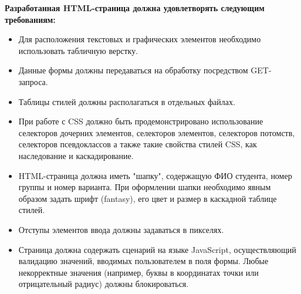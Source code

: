 \documentclass[12pt]{article}
\begin{document}
\textbf{Разработанная HTML-страница должна удовлетворять следующим требованиям:}\\
\begin{itemize}
    \item Для расположения текстовых и графических элементов необходимо использовать
    табличную верстку.\\
    \item Данные формы должны передаваться на обработку посредством GET-запроса.\\
    \item Таблицы стилей должны располагаться в отдельных файлах.\\
    \item При работе с CSS должно быть продемонстрировано использование селекторов дочерних
    элементов, селекторов элементов, селекторов потомств, селекторов псевдоклассов а также
    такие свойства стилей CSS, как наследование и каскадирование.\\
    \item HTML-страница должна иметь "шапку", содержащую ФИО студента, номер группы и
    номер варианта. При оформлении шапки необходимо явным образом задать шрифт
    (fantasy), его цвет и размер в каскадной таблице стилей.\\
    \item Отступы элементов ввода должны задаваться в пикселях.\\
    \item Страница должна содержать сценарий на языке JavaScript, осуществляющий валидацию
    значений, вводимых пользователем в поля формы. Любые некорректные значения
    (например, буквы в координатах точки или отрицательный радиус) должны блокироваться.\\
\end{itemize}

\vspace{1cm}

\end{document}
